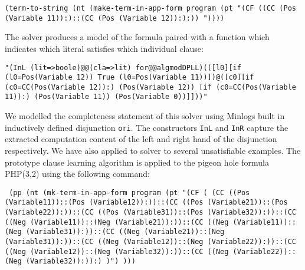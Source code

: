 \begin{center}\texttt{(term-to-string (nt (make-term-in-app-form program (pt "(CF ((CC (Pos (Variable 11)):)::(CC (Pos (Variable 12)):):)) "))))}
\end{center}

The solver produces a model of the formula paired with a function which indicates which literal satisfies which individual clause:

\begin{center}
\texttt{"(InL (lit=>boole)@@(cla=>lit) for@@algmodDPLL)(([l0][if (l0=Pos(Variable 12)) True (l0=Pos(Variable 11))])@([c0][if (c0=CC(Pos(Variable 12)):) (Pos(Variable 12)) [if (c0=CC(Pos(Variable 11)):) (Pos(Variable 11)) (Pos(Variable 0))]]))"}                                                                      
\end{center}

We modelled the completeness statement of this solver using Minlogs built in inductively defined disjunction \texttt{ori}. The constructors \texttt{InL} and \texttt{InR} capture the extracted computation content of the left and right hand of the disjunction respectively. We have also applied to solver to several unsatisfiable examples. The prototype clause learning algorithm is applied to the pigeon hole formula PHP(3,2) using the following command:

\begin{center}
\texttt{
(pp (nt (mk-term-in-app-form program (pt "(CF (                                                                
(CC ((Pos (Variable11))::(Pos (Variable12)):))::(CC ((Pos (Variable21))::(Pos (Variable22)):))::(CC ((Pos (Variable31))::(Pos (Variable32)):))::(CC ((Neg (Variable11))::(Neg (Variable21)):))::(CC ((Neg (Variable11))::(Neg (Variable31)):))::(CC ((Neg (Variable21))::(Neg (Variable31)):))::(CC ((Neg (Variable12))::(Neg (Variable22)):))::(CC ((Neg (Variable12))::(Neg (Variable32)):))::(CC ((Neg (Variable22))::(Neg (Variable32)):)):) )") )))}
\end{center}


